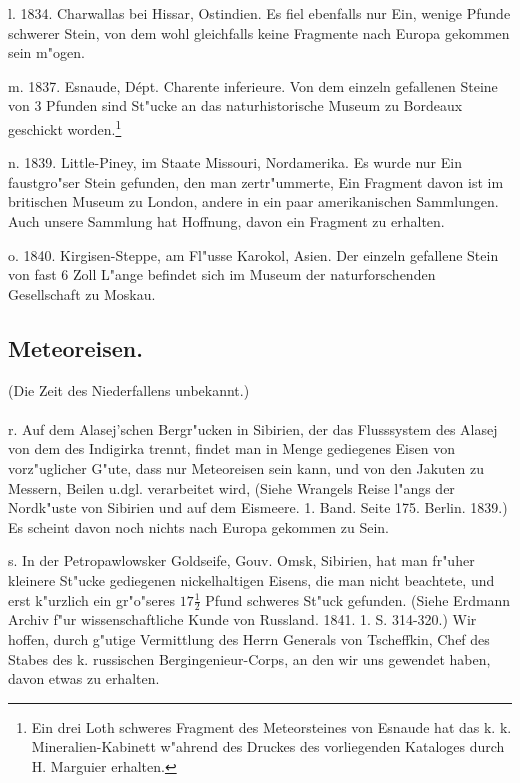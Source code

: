 \documentclass[a4paper, 11pt, oneside, polutonikogreek, german]{article}
\begin{document}
l. 1834. Charwallas bei Hissar, Ostindien. Es fiel ebenfalls nur Ein, wenige Pfunde schwerer Stein, von dem wohl gleichfalls keine Fragmente nach Europa gekommen sein m"ogen.

m. 1837. Esnaude, Dépt. Charente inferieure. Von dem einzeln gefallenen Steine von 3 Pfunden sind St"ucke an das naturhistorische Museum zu Bordeaux geschickt worden.\footnote{Ein drei Loth schweres Fragment des Meteorsteines von Esnaude hat das k. k. Mineralien-Kabinett w"ahrend des Druckes des vorliegenden Kataloges durch H. Marguier erhalten.}

n. 1839. Little-Piney, im Staate Missouri, Nordamerika. Es wurde nur Ein faustgro"ser Stein gefunden, den man zertr"ummerte, Ein Fragment davon ist im britischen Museum zu London, andere in ein paar amerikanischen Sammlungen. Auch unsere Sammlung hat Hoffnung, davon ein Fragment zu erhalten.

o. 1840. Kirgisen-Steppe, am Fl"usse Karokol, Asien. Der einzeln gefallene Stein von fast 6 Zoll L"ange befindet sich im Museum der naturforschenden Gesellschaft zu Moskau.
\subsection{Meteoreisen.}
\begin{center}
(Die Zeit des Niederfallens unbekannt.)
\end{center}
\paragraph{}
r. Auf dem Alasej'schen Bergr"ucken in Sibirien, der das Flusssystem des Alasej von dem des Indigirka trennt, findet man in Menge gediegenes Eisen von vorz"uglicher G"ute, dass nur Meteoreisen sein kann, und von den Jakuten zu Messern, Beilen u.dgl. verarbeitet wird, (Siehe Wrangels Reise l"angs der Nordk"uste von Sibirien und auf dem Eismeere. 1. Band. Seite 175. Berlin. 1839.) Es scheint davon noch nichts nach Europa gekommen zu Sein.

s. In der Petropawlowsker Goldseife, Gouv. Omsk, Sibirien, hat man fr"uher kleinere St"ucke gediegenen nickelhaltigen Eisens, die man nicht beachtete, und erst k"urzlich ein gr"o"seres $17\frac{1}{2}$ Pfund schweres St"uck gefunden. (Siehe Erdmann Archiv f"ur wissenschaftliche Kunde von Russland. 1841. 1. S. 314-320.) Wir hoffen, durch g"utige Vermittlung des Herrn Generals von Tscheffkin, Chef des Stabes des k. russischen Bergingenieur-Corps, an den wir uns gewendet haben, davon etwas zu erhalten.
\end{document}
